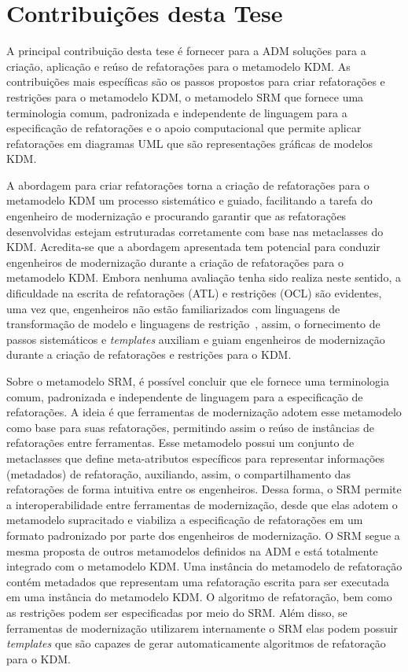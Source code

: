 \section{Contribuições desta Tese}\label{sec:contribuicoes_desta_tese}

A principal contribuição desta tese é fornecer para a ADM soluções para a criação, aplicação e reúso de refatorações para o metamodelo KDM. As contribuições mais específicas são os passos propostos para criar refatorações e restrições para o metamodelo KDM, o metamodelo SRM que fornece uma terminologia comum, padronizada e independente de linguagem para a especificação de refatorações e o apoio computacional que permite aplicar refatorações em diagramas UML que são representações gráficas de modelos KDM. 

A abordagem para criar refatorações torna a criação de refatorações para o metamodelo KDM um processo sistemático e guiado, facilitando a tarefa do engenheiro de modernização e procurando garantir que as refatorações desenvolvidas estejam estruturadas corretamente com base nas metaclasses do KDM. Acredita-se que a abordagem apresentada tem potencial para conduzir engenheiros de modernização durante a criação de refatorações para o metamodelo KDM. Embora nenhuma avaliação tenha sido realiza neste sentido, a dificuldade na escrita de refatorações (ATL) e restrições (OCL) são evidentes, uma vez que, engenheiros não estão familiarizados com linguagens de transformação de modelo e linguagens de restrição~\cite{Sendall_2003_rafael_final}, assim, o fornecimento de passos sistemáticos e \textit{templates} auxiliam e guiam engenheiros de modernização durante a criação de refatorações e restrições para o KDM.

Sobre o metamodelo SRM, é possível concluir que ele fornece uma terminologia comum, padronizada e independente de linguagem para a especificação de refatorações. A ideia é que ferramentas de modernização adotem esse metamodelo como base para suas refatorações, permitindo assim o reúso de instâncias de refatorações entre ferramentas. Esse metamodelo possui um conjunto de metaclasses que define meta-atributos específicos para representar informações (metadados) de refatoração, auxiliando, assim, o compartilhamento das refatorações de forma intuitiva entre os engenheiros. Dessa forma, o SRM permite a interoperabilidade entre ferramentas de modernização, desde que elas adotem o metamodelo supracitado e viabiliza a especificação de refatorações em um formato padronizado por parte dos engenheiros de modernização. O SRM segue a mesma proposta de outros metamodelos definidos na ADM e está totalmente integrado com o metamodelo KDM. Uma instância do metamodelo de refatoração contém metadados que representam uma refatoração escrita para ser executada em uma instância do metamodelo KDM. O algoritmo de refatoração, bem como as restrições podem ser especificadas por meio do SRM. Além disso, se ferramentas de modernização utilizarem internamente o SRM elas podem possuir \textit{templates} que são capazes de gerar automaticamente algoritmos de refatoração para o KDM. %

